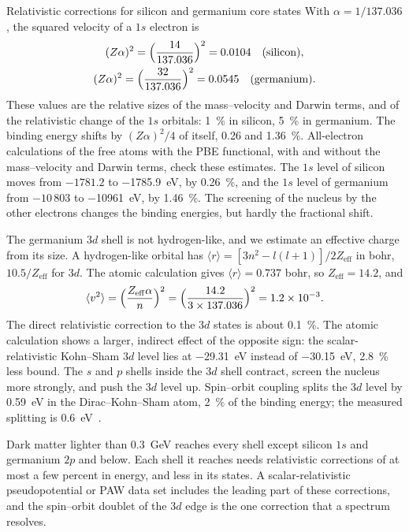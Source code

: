 \begin{workedexample}{Relativistic corrections for silicon and germanium core states}\label{we:3-Zalpha}
With $\alpha = 1/137.036$, the squared velocity of a $1s$ electron is
\begin{gather*}
  (Z\alpha)^2 = \Bigl(\frac{14}{137.036}\Bigr)^2 = 0.0104 \quad\text{(silicon)}, \\
  (Z\alpha)^2 = \Bigl(\frac{32}{137.036}\Bigr)^2 = 0.0545 \quad\text{(germanium)}.
\end{gather*}
These values are the relative sizes of the mass--velocity and Darwin terms, and of the relativistic change of the $1s$ orbitals: \SI{1}{\percent} in silicon, \SI{5}{\percent} in germanium. The binding energy shifts by $(Z\alpha)^2/4$ of itself, 0.26 and \SI{1.36}{\percent}. All-electron calculations of the free atoms with the PBE functional, with and without the mass--velocity and Darwin terms, check these estimates. The $1s$ level of silicon moves from $-1781.2$ to \SI{-1785.9}{eV}, by \SI{0.26}{\percent}, and the $1s$ level of germanium from $-10\,803$ to \SI{-10961}{eV}, by \SI{1.46}{\percent}. The screening of the nucleus by the other electrons changes the binding energies, but hardly the fractional shift.

The germanium $3d$ shell is not hydrogen-like, and we estimate an effective charge from its size. A hydrogen-like orbital has $\langle r\rangle = [3n^2 - l(l + 1)]/2Z_{\mathrm{eff}}$ in bohr, $10.5/Z_{\mathrm{eff}}$ for $3d$. The atomic calculation gives $\langle r\rangle = 0.737$ bohr, so $Z_{\mathrm{eff}} = 14.2$, and
\begin{equation*}
  \langle v^2\rangle = \Bigl(\frac{Z_{\mathrm{eff}}\alpha}{n}\Bigr)^2 = \Bigl(\frac{14.2}{3\times137.036}\Bigr)^2 = 1.2\times10^{-3} .
\end{equation*}
The direct relativistic correction to the $3d$ states is about \SI{0.1}{\percent}. The atomic calculation shows a larger, indirect effect of the opposite sign: the scalar-relativistic Kohn--Sham $3d$ level lies at \SI{-29.31}{eV} instead of \SI{-30.15}{eV}, \SI{2.8}{\percent} less bound. The $s$ and $p$ shells inside the $3d$ shell contract, screen the nucleus more strongly, and push the $3d$ level up. Spin--orbit coupling splits the $3d$ level by \SI{0.59}{eV} in the Dirac--Kohn--Sham atom, \SI{2}{\percent} of the binding energy; the measured splitting is \SI{0.6}{eV}~\cite[Table~1-1]{williams2009electron}.

Dark matter lighter than \SI{0.3}{GeV} reaches every shell except silicon $1s$ and germanium $2p$ and below. Each shell it reaches needs relativistic corrections of at most a few percent in energy, and less in its states. A scalar-relativistic pseudopotential or PAW data set includes the leading part of these corrections, and the spin--orbit doublet of the $3d$ edge is the one correction that a spectrum resolves.
\end{workedexample}
